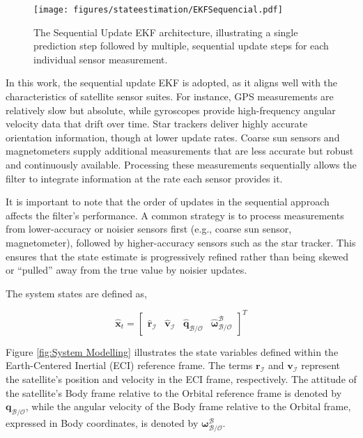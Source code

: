 \begin{figure}[H]
    \centering
    \texttt{[image: figures/stateestimation/EKFSequencial.pdf]}
    \caption{The Sequential Update EKF architecture, illustrating a single prediction step followed by multiple, sequential update steps for each individual sensor measurement.}
    \label{fig:EKFS}
\end{figure}

\noindent
In this work, the sequential update EKF is adopted, as it aligns well with the characteristics of satellite sensor suites. For instance, 
GPS measurements are relatively slow but absolute, while gyroscopes provide high-frequency angular velocity data that drift over time. Star trackers 
deliver highly accurate orientation information, though at lower update rates. Coarse sun sensors and magnetometers supply additional measurements 
that are less accurate but robust and continuously available. Processing these measurements sequentially allows the filter to integrate information at 
the rate each sensor provides it.
\vspace{0.5cm}

\noindent
It is important to note that the order of updates in the sequential approach affects the filter's performance. A common strategy is to process measurements 
from lower-accuracy or noisier sensors first (e.g., coarse sun sensor, magnetometer), followed by higher-accuracy sensors such as the star tracker. 
This ensures that the state estimate is progressively refined rather than being skewed or “pulled” away from the true value by noisier updates.

\label{sec:statesystemmodel}

The system states are defined as,

\begin{equation}
    \mathbf{\hat{x}}_t =
    \begin{bmatrix}
        \mathbf{\hat{r}}_\mathcal{I} & \mathbf{\hat{v}}_\mathcal{I} & \mathbf{\hat{q}}_\mathcal{B/O} & \boldsymbol{\hat{\omega}}_\mathcal{B/O}^\mathcal{B}
    \end{bmatrix}
    ^T
\end{equation}

\noindent
Figure \ref{fig:System Modelling} illustrates the state variables defined within the Earth-Centered Inertial (ECI) reference frame. The terms $ \mathbf{r}_\mathcal{I} $ and
$ \mathbf{v}_\mathcal{I} $ represent the satellite's position and velocity in the ECI frame, respectively. The attitude of the satellite's Body frame relative to the Orbital 
reference frame is denoted by $ \mathbf{q}_\mathcal{B/O} $, while the angular velocity of the Body frame relative to the Orbital frame, expressed in Body coordinates, 
is denoted by $ \boldsymbol{\omega}_\mathcal{B/O}^\mathcal{B} $.


